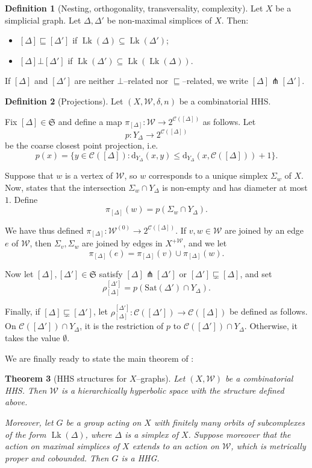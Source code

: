 \documentclass[svgnames]{amsart}
\theoremstyle{plain}
\newtheorem{thm}{Theorem}[section]
\theoremstyle{definition}
\newtheorem{defn}[thm]{Definition}
\newcommand{\frakS}{\mathfrak S}
\newcommand{\C}{\mathcal C}
\newcommand{\dist}{\mathrm{d}}
\newcommand{\nest}{\sqsubseteq}
\newcommand{\propnest}{\sqsubsetneq}
\newcommand{\orth}{\bot}
\newcommand{\transverse}{\pitchfork}
\newcommand{\link}{\operatorname{Lk}}
\newcommand{\duaug}[2]{{#1}^{+{#2}}}
\newcommand{\Sat}{\mathrm{Sat}}
\newcommand{\W}{\mathcal{W}}
\begin{document}
\begin{defn}[Nesting, orthogonality, transversality, complexity]\label{defn:nest_orth}
Let $X$ be a simplicial graph.  Let $\Delta,\Delta'$ be non-maximal simplices of $X$.  Then:
\begin{itemize}
     \item $[\Delta]\nest[\Delta']$ if $\link(\Delta)\subseteq\link(\Delta')$;
     \item $[\Delta]\orth[\Delta']$ if $\link(\Delta')\subseteq \link(\link(\Delta))$.
\end{itemize}
If $[\Delta]$ and $[\Delta']$ are neither $\orth$--related nor $\nest$--related, we write 
$[\Delta]\transverse[\Delta']$.
\end{defn}

\begin{defn}[Projections]\label{defn:projections}
Let $(X,\W,\delta,n)$ be a combinatorial HHS.  

Fix $[\Delta]\in\frakS$ and define a map $\pi_{[\Delta]}:\W\to 2^{\C  ([\Delta])}$ as follows. Let
$$p:Y_\Delta\to2^{\C  ([\Delta])}$$
be the coarse closest point projection, i.e. 
$$p(x)=\{y\in\C  ([\Delta]):\dist_{Y_\Delta}(x,y)\le\dist_{Y_\Delta}(x,\C  ([\Delta]))+1\}.$$

Suppose that $w$ is a vertex of $\W$, so $w$ corresponds to a unique simplex $\Sigma_w$ of $X$. Now, \cite[Lemma 1.15]{BHMS} states that the intersection $\Sigma_w\cap Y_\Delta$ is non-empty and has diameter at most $1$. Define $$\pi_{[\Delta]}(w)=p(\Sigma_w\cap Y_\Delta).$$

We have thus defined  $\pi_{[\Delta]}:\W^{(0)}\to 2^{\C  ([\Delta])}$. If $v,w\in \W$ are joined by an edge $e$ of $\W$, then $\Sigma_v,\Sigma_w$ are joined by edges in $\duaug{X}{\W}$, and we let
$$\pi_{[\Delta]}(e)=\pi_{[\Delta]}(v)\cup\pi_{[\Delta]}(w).$$

Now let $[\Delta],[\Delta']\in\frakS$ satisfy $[\Delta]\transverse[\Delta']$ or $[\Delta']\propnest [\Delta]$, and set $$\rho^{[\Delta']}_{[\Delta]}=p(\Sat(\Delta')\cap Y_\Delta).$$

Finally, if $[\Delta]\propnest [\Delta']$, let $\rho^{[\Delta']}_{[\Delta]}:\C  ([\Delta'])\to \C  ([\Delta])$ be defined as follows.  On $\C  ([\Delta'])\cap Y_\Delta$, it is the restriction of $p$ to $\C  ([\Delta'])\cap Y_\Delta$. Otherwise, it takes the value $\emptyset$.
\end{defn}

We are finally ready to state the main theorem of \cite{BHMS}:
\begin{thm}[HHS structures for $X$--graphs]\label{thm:hhs_links}
Let $(X,\W)$ be a combinatorial HHS. Then $\W$ is a hierarchically hyperbolic space with the structure defined above.

Moreover, let $G$ be a group acting on $X$ with finitely many orbits of subcomplexes of the form $\link(\Delta)$, where $\Delta$ is a simplex of $X$. Suppose moreover that the action on maximal simplices of $X$ extends to an action on $\W$, which is metrically proper and cobounded. Then $G$ is a HHG.
\end{thm}
\end{document}
